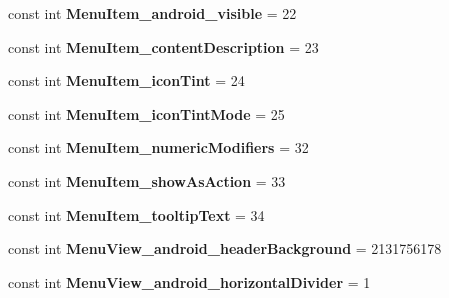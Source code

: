 \begin{DoxyCompactItemize}
const int {\bfseries Menu\+Item\+\_\+android\+\_\+visible} = 22
\item 
\mbox{\label{classst_delivery_1_1_resource_1_1_styleable_a13ef49bb8122116318133730a1c4deae}} 
const int {\bfseries Menu\+Item\+\_\+content\+Description} = 23
\item 
\mbox{\label{classst_delivery_1_1_resource_1_1_styleable_ab6955ec2915991df2022b1dda1a0f766}} 
const int {\bfseries Menu\+Item\+\_\+icon\+Tint} = 24
\item 
\mbox{\label{classst_delivery_1_1_resource_1_1_styleable_a689bfe9662cd0ade449edd4a13e07277}} 
const int {\bfseries Menu\+Item\+\_\+icon\+Tint\+Mode} = 25
\item 
\mbox{\label{classst_delivery_1_1_resource_1_1_styleable_a868cb1e02eec76724fd0c7096eb83bba}} 
const int {\bfseries Menu\+Item\+\_\+numeric\+Modifiers} = 32
\item 
\mbox{\label{classst_delivery_1_1_resource_1_1_styleable_a402f07678e1f53367aaf68e0b09639ca}} 
const int {\bfseries Menu\+Item\+\_\+show\+As\+Action} = 33
\item 
\mbox{\label{classst_delivery_1_1_resource_1_1_styleable_a4e860b1a1b5c0400168bf7229c88e969}} 
const int {\bfseries Menu\+Item\+\_\+tooltip\+Text} = 34
\item 
\mbox{\label{classst_delivery_1_1_resource_1_1_styleable_a998ae1b54c08014d6ad98e7d32473e3c}} 
const int {\bfseries Menu\+View\+\_\+android\+\_\+header\+Background} = 2131756178
\item 
\mbox{\label{classst_delivery_1_1_resource_1_1_styleable_a36e384f0ac2b6fe65047bb059728f119}} 
const int {\bfseries Menu\+View\+\_\+android\+\_\+horizontal\+Divider} = 1
\item 
\mbox{\label{classst_delivery_1_1_resource_1_1_styleable_afaeb6f5c00c2de97131184c6c473225c}} 

\end{DoxyCompactItemize}
